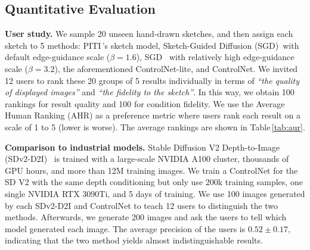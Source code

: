 \documentclass[10pt,twocolumn,letterpaper]{article}
\def\para#1{\vspace{0.25em}\noindent\textbf{#1}}
\begin{document}
	
	
	\subsection{Quantitative Evaluation}
	
	\para{User study.} We sample 20 unseen hand-drawn sketches, and then assign each sketch to 5 methods: 
	PITI\,\cite{wang2022pretraining}'s sketch model,
	Sketch-Guided Diffusion (SGD)\,\cite{voynov2022sketch} with default edge-guidance scale ($\beta=1.6$),
	SGD~\cite{voynov2022sketch} with relatively high edge-guidance scale ($\beta=3.2$),
	the aforementioned ControlNet-lite, and ControlNet. We invited 
	12 users to rank these 20 groups of 5 results individually in terms of \emph{``the quality of displayed images''} and \emph{``the fidelity to the sketch''}.
	In this way, we obtain 100 rankings for result quality and 100 for condition fidelity.
	We use the Average Human Ranking (AHR) as a preference metric where users rank each result on a scale of 1 to 5 (lower is worse).
	The average rankings are shown in Table\,\ref{tab:aur}.
	
	\para{Comparison to industrial models.} Stable Diffusion V2 Depth-to-Image (SDv2-D2I)~\cite{sdd} is trained with a large-scale NVIDIA A100 cluster, thousands of GPU hours, and more than 12M training images. We train a ControlNet for the SD V2 with the same depth conditioning but only use 200k training samples, one single NVIDIA RTX 3090Ti, and 5 days of training. We use 100 images generated by each SDv2-D2I and ControlNet to teach 12 users to distinguish the two methods. Afterwards, we generate 200 images and ask the users to tell which model generated each image. The average precision of the users is $0.52 \pm 0.17$, indicating that the two method yields almost indistinguishable results.
	
\end{document}
